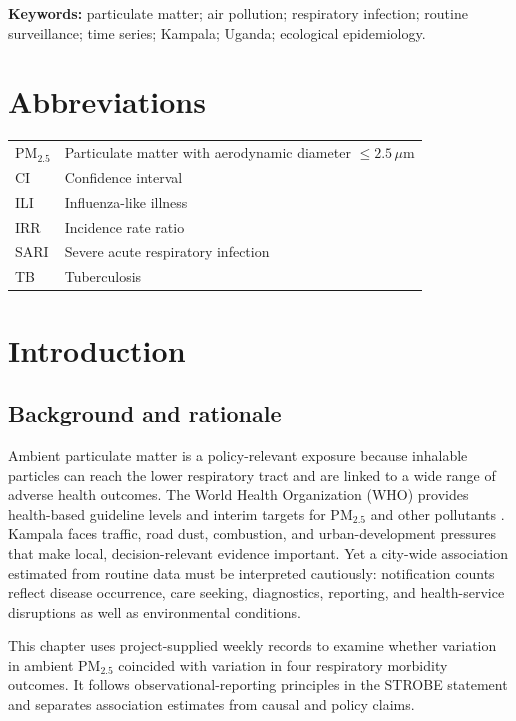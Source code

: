 \documentclass[12pt,a4paper]{report}
\newcommand{\pmfive}{PM$_{2.5}$}
\begin{document}
\vspace{0.5cm}
\noindent\textbf{Keywords:} particulate matter; air pollution; respiratory infection; routine surveillance; time series; Kampala; Uganda; ecological epidemiology.

\chapter*{Abbreviations}
\begin{tabular}{ll}
\pmfive{} & Particulate matter with aerodynamic diameter $\leq 2.5\,\mu$m \\
CI & Confidence interval \\
ILI & Influenza-like illness \\
IRR & Incidence rate ratio \\
SARI & Severe acute respiratory infection \\
TB & Tuberculosis \\
\end{tabular}

\tableofcontents
\clearpage
{}

\chapter{Introduction}
\section{Background and rationale}
Ambient particulate matter is a policy-relevant exposure because inhalable particles can reach the lower respiratory tract and are linked to a wide range of adverse health outcomes. The World Health Organization (WHO) provides health-based guideline levels and interim targets for \pmfive{} and other pollutants \parencite{WHO2021}. Kampala faces traffic, road dust, combustion, and urban-development pressures that make local, decision-relevant evidence important. Yet a city-wide association estimated from routine data must be interpreted cautiously: notification counts reflect disease occurrence, care seeking, diagnostics, reporting, and health-service disruptions as well as environmental conditions.

This chapter uses project-supplied weekly records to examine whether variation in ambient \pmfive{} coincided with variation in four respiratory morbidity outcomes. It follows observational-reporting principles in the STROBE statement \parencite{vonElm2007} and separates association estimates from causal and policy claims.
\end{document}
